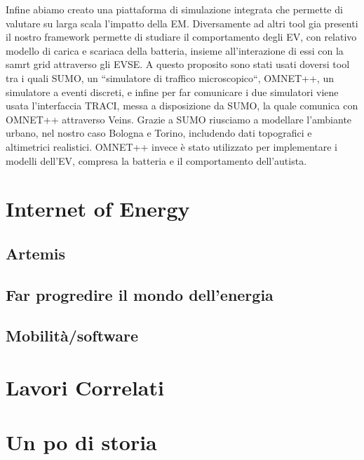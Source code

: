 Infine abiamo creato una piattaforma di simulazione integrata che permette di valutare su larga scala
l'impatto della EM. Diversamente ad altri tool gia presenti il nostro framework permette di studiare 
il comportamento degli EV, con relativo modello di carica e scariaca della batteria, insieme all'interazione
di essi con la samrt grid attraverso gli EVSE. A questo proposito sono stati usati doversi tool tra i quali
SUMO, un ``simulatore di traffico microscopico``, OMNET++, un simulatore a eventi discreti, e infine per 
far comunicare i due simulatori viene usata l'interfaccia TRACI, messa a disposizione da SUMO, la quale
comunica con OMNET++ attraverso Veins. Grazie a SUMO riusciamo a modellare l'ambiante urbano, nel nostro 
caso Bologna e Torino, includendo dati topografici e altimetrici realistici. OMNET++ invece è stato
utilizzato per implementare i modelli dell'EV, compresa la batteria e il comportamento dell'autista.

\section{Internet of Energy}

\subsection{Artemis}


\subsection{Far progredire il mondo dell'energia}


\subsection{Mobilità/software}

%

\section{Lavori Correlati}



\section{Un po di storia}\label{sec:unpodistoria}


